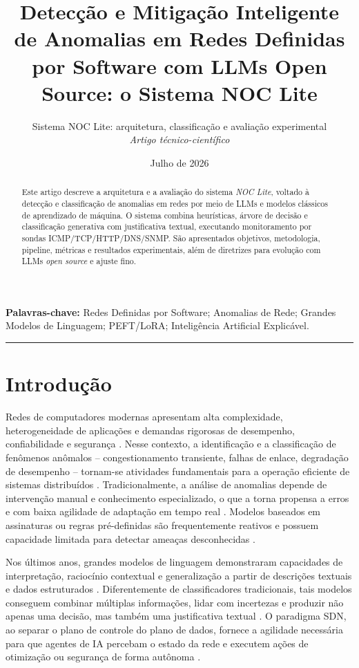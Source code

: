 \documentclass[12pt,a4paper]{article}
\title{\textbf{Detecção e Mitigação Inteligente de Anomalias em Redes Definidas por Software com LLMs Open Source: o Sistema NOC Lite}}
\author{Sistema NOC Lite: arquitetura, classificação e avaliação experimental \\[2mm] \textit{Artigo técnico-científico}}
\date{Julho de 2026}
\begin{document}
\maketitle
\tableofcontents
\newpage

\begin{abstract}
Este artigo descreve a arquitetura e a avaliação do sistema \textit{NOC Lite}, voltado à detecção e classificação de anomalias em redes por meio de LLMs e modelos clássicos de aprendizado de máquina. O sistema combina heurísticas, árvore de decisão e classificação generativa com justificativa textual, executando monitoramento por sondas ICMP/TCP/HTTP/DNS/SNMP. São apresentados objetivos, metodologia, pipeline, métricas e resultados experimentais, além de diretrizes para evolução com LLMs \textit{open source} e ajuste fino.
\end{abstract}

\noindent\textbf{Palavras-chave:} Redes Definidas por Software; Anomalias de Rede;
Grandes Modelos de Linguagem; PEFT/LoRA; Inteligência Artificial Explicável.

\vspace{6pt}
\hrule
\vspace{10pt}

\section{Introdução}
\label{sec:intro}

Redes de computadores modernas apresentam alta complexidade, heterogeneidade de
aplicações e demandas rigorosas de desempenho, confiabilidade e segurança
. Nesse contexto, a identificação e a classificação de fenômenos
anômalos -- congestionamento transiente, falhas de enlace, degradação de
desempenho -- tornam-se atividades fundamentais para a operação eficiente de
sistemas distribuídos \cite{rA39}. Tradicionalmente, a análise de anomalias depende
de intervenção manual e conhecimento especializado, o que a torna propensa a
erros e com baixa agilidade de adaptação em tempo real \cite{rA39}. Modelos baseados
em assinaturas ou regras pré-definidas são frequentemente reativos e possuem
capacidade limitada para detectar ameaças desconhecidas \cite{rA512}.

Nos últimos anos, grandes modelos de linguagem demonstraram capacidades de
interpretação, raciocínio contextual e generalização a partir de descrições
textuais e dados estruturados \cite{rA31}. Diferentemente de classificadores
tradicionais, tais modelos conseguem combinar múltiplas informações, lidar com
incertezas e produzir não apenas uma decisão, mas também uma justificativa
textual \cite{rA321}. O paradigma SDN, ao separar o plano de controle do plano de
dados, fornece a agilidade necessária para que agentes de IA percebam o estado
da rede e executem ações de otimização ou segurança de forma autônoma \cite{rA19}.
\end{document}
